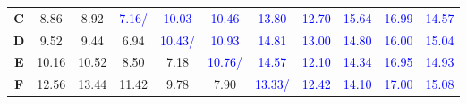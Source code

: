 \documentclass[11pt,fleqn]{book} %
\begin{document}
\begin{table}
\begin{tabularx}{\textwidth}{ C{1} | C{1} C{1} C{1} C{1} C{1} C{1} C{1} C{1} C{1} C{1}}
    \textbf{C} & \vspace{0pt}8.86 & \vspace{0pt}8.92 &\textcolor{blue}{7.16/} 
    & \vspace{0pt} \textcolor{blue}{10.03} &\vspace{0pt}\textcolor{blue}{10.46} & \vspace{0pt} \textcolor{blue}{13.80} 
    &\vspace{0pt} \textcolor{blue}{12.70} & \vspace{0pt}\textcolor{blue}{15.64} &\vspace{0pt} \textcolor{blue}{16.99}
    &\vspace{0pt} \textcolor{blue}{14.57}\tabularnewline
    
    \textbf{D} & \vspace{0pt}9.52 & \vspace{0pt}9.44 & \vspace{0pt}6.94
    & \textcolor{blue}{10.43/}  &\vspace{0pt}\textcolor{blue}{10.93} & \vspace{0pt} \textcolor{blue}{14.81} 
    &\vspace{0pt} \textcolor{blue}{13.00} & \vspace{0pt}\textcolor{blue}{14.80} &\vspace{0pt} \textcolor{blue}{16.00}
    &\vspace{0pt} \textcolor{blue}{15.04}\tabularnewline
    
    \textbf{E} & \vspace{0pt}10.16 & \vspace{0pt}10.52 & \vspace{0pt}8.50
    & \vspace{0pt}7.18 &  \textcolor{blue}{10.76/}  & \vspace{0pt} \textcolor{blue}{14.57} 
    &\vspace{0pt} \textcolor{blue}{12.10} & \vspace{0pt}\textcolor{blue}{14.34} &\vspace{0pt} \textcolor{blue}{16.95}
    &\vspace{0pt} \textcolor{blue}{14.93}\tabularnewline
    
    \textbf{F} & \vspace{0pt}12.56 & \vspace{0pt}13.44 & \vspace{0pt}11.42
    & \vspace{0pt}9.78 &  \vspace{0pt}7.90 & \textcolor{blue}{13.33/}  
    &\vspace{0pt} \textcolor{blue}{12.42} & \vspace{0pt}\textcolor{blue}{14.10} &\vspace{0pt} \textcolor{blue}{17.00}
    &\vspace{0pt} \textcolor{blue}{15.08}\tabularnewline
    

\end{tabularx}
\end{table}
\end{document}
